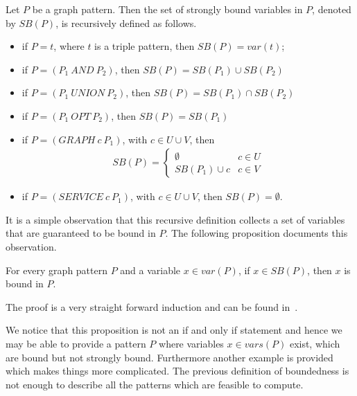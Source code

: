 \begin{definition}
Let $P$ be a graph pattern. Then the set of strongly bound variables in $P$,
denoted by $SB(P)$, is recursively defined as follows.

\begin{itemize}
\item if $P =t$, where $t$ is a triple pattern, then $SB(P) = var(t)$;
\item if $P = (P_1 \ AND \ P_2)$, then $SB(P) = SB(P_1) \cup SB(P_2)$ 
\item if $P = (P_1  \ UNION \ P_2)$, then $SB(P) = SB(P_1) \cap SB(P_2)$ 
\item if $P = (P_1 \ OPT \ P_2)$, then $SB(P) = SB(P_1)$ 
\item if $P = (GRAPH \ c \ P_1)$, with $c \in U\cup V$, 
then\\
\begin{align*}
	SB(P) = 
\begin{cases} 
    \emptyset & \mbox{$c \in U$} \\
    SB(P_1) \cup c &\mbox{$c \in V$} 
\end{cases}
\end{align*}

\item if $P = (SERVICE \ c \ P_1)$, with $c \in U \cup V$, then $SB(P) = \emptyset$.
\end{itemize}
\end{definition}

It is a simple observation that this recursive definition collects a set of
variables that are guaranteed to be bound in $P$. The following proposition
documents this observation.

\begin{proposition}\label{sbinb}
For every graph pattern $P$ and a variable $x \in var(P)$, if $x \in SB(P)$,
then $x$ is bound in $P$.
\end{proposition}
The proof is a very straight forward induction and can be found
in~\cite[Appendix A]{BuilAranda20131}.

We notice that this proposition is not an if and only if statement and hence we may be
able to provide a pattern $P$ where variables $x \in vars(P)$ exist, which are bound but not
strongly bound. Furthermore another example is provided which makes things more
complicated. The previous definition of boundedness is not enough to describe
all the patterns which are feasible to compute. 

